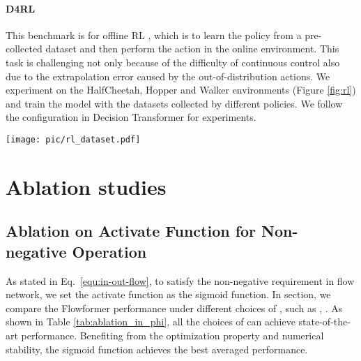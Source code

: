 \documentclass[nohyperref]{article}
\theoremstyle{plain}
\theoremstyle{definition}
\theoremstyle{remark}
\begin{document}
\paragraph{D4RL} 
This benchmark is for offline RL \cite{lange2012batch, levine2020offline}, which is to learn the policy from a pre-collected dataset and then perform the action in the online environment. This task is challenging not only because of the difficulty of continuous control also due to the extrapolation error caused by the out-of-distribution actions. We experiment on the HalfCheetah, Hopper and Walker environments (Figure \ref{fig:rl}) and train the model with the datasets collected by different policies. We follow the configuration in Decision Transformer \cite{chen2021decisiontransformer} for experiments. 

\begin{figure*}[h]
\begin{center}
	\centerline{\texttt{[image: pic/rl\_dataset.pdf]}}
	\vspace{-5pt}
	\caption{HalfCheetah, Hopper and Walker environments. }
	\label{fig:rl}
\end{center}
\vspace{-20pt}
\end{figure*}

\section{Ablation studies}

\subsection{Ablation on Activate Function for Non-negative Operation}

As stated in Eq.~\eqref{equ:in-out-flow}, to satisfy the non-negative requirement in flow network, we set the activate function  as the sigmoid function. In section, we compare the Flowformer performance under different choices of , such as , . As shown in Table \ref{tab:ablation_in_phi}, all the choices of  can achieve state-of-the-art performance. Benefiting from the optimization property and numerical stability, the sigmoid function achieves the best averaged performance.
\end{document}
